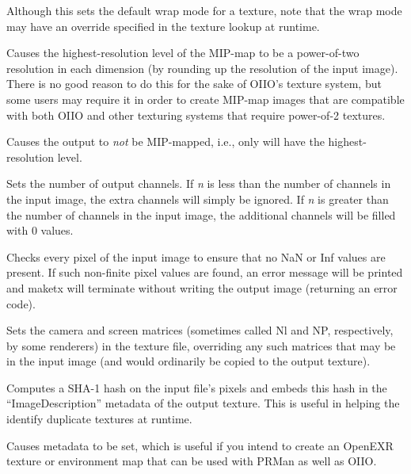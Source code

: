 Although this sets the default wrap mode for a texture, note that
the wrap mode may have an override specified in the texture lookup
at runtime.
\apiend

Causes the highest-resolution level of the MIP-map to be a
power-of-two resolution in each dimension
(by rounding up the resolution of the input image).  There is no
good reason to do this for the sake of OIIO's texture system, but 
some users may require it in order to create MIP-map images
that are compatible with both OIIO and other texturing systems that
require power-of-2 textures.
\apiend

Causes the output to \emph{not} be MIP-mapped, i.e., only will have
the highest-resolution level.
\apiend

Sets the number of output channels.  If \emph{n} is less than the 
number of channels in the input image, the extra channels will simply
be ignored.  If \emph{n} is greater than the number of channels in the
input image, the additional channels will be filled with 0 values.
\apiend

Checks every pixel of the input image to ensure that no NaN or Inf
values are present.  If such non-finite pixel values are found, 
an error message will be printed and {\cf maketx} will terminate without
writing the output image (returning an error code).
\apiend


Sets the camera and screen matrices (sometimes called {\cf Nl} and
{\cf NP}, respectively, by some renderers) in the texture file, 
overriding any such matrices that may be in the input image (and would
ordinarily be copied to the output texture).
\apiend

Computes a SHA-1 hash on the input file's pixels and embeds this hash
in the ``ImageDescription'' metadata of the output texture.  This is
useful in helping the \TextureSystem identify duplicate textures at
runtime.
\apiend

Causes metadata  to be set, which is useful if
you intend to create an OpenEXR texture or environment map that can be
used with PRMan as well as OIIO.
\apiend

